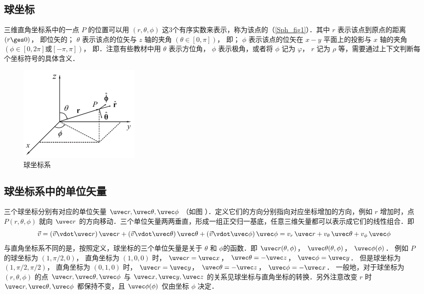 

\subsection{球坐标}

三维直角坐标系中的一点 $P$ 的位置可以用 $(r,\theta ,\phi )$ 这3个有序实数来表示，称为该点的（\autoref{Sph_fig1}）．其中 $r$ 表示该点到原点的距离 $(r \ges 0)$， 即位矢的； $\theta$ 表示该点的位矢与 $z$ 轴的夹角 $(\theta  \in [0,\pi])$， 即； $\phi$ 表示该点的位矢在 $x - y$ 平面上的投影与 $x$ 轴的夹角 $(\phi  \in [0,2\pi]\text{或}[- \pi,\pi])$， 即．注意有些教材中用 $\theta $ 表示方位角， $\phi $ 表示极角，或者将 $\phi $ 记为 $\varphi $，  $r$ 记为 $\rho $ 等，需要通过上下文判断每个坐标符号的具体含义．

\begin{figure}[ht]
\centering
\includegraphics[width=6cm]{./figures/Sph.pdf}
\caption{球坐标系}\label{Sph_fig1}
\end{figure}

\subsection{球坐标系中的单位矢量}
三个球坐标分别有对应的单位矢量 $\uvec r, \uvec\theta, \uvec\phi$ （如图%
）．定义它们的方向分别指向对应坐标增加的方向，例如 $r$ 增加时，点 $P(r,\theta ,\phi )$ 就向 $\uvec r$ 的方向移动．三个单位矢量两两垂直，形成一组正交归一基底，任意三维矢量都可以表示成它们的线性组合．即
\begin{equation}
\vec v = (\vec v \vdot \uvec r)\,\uvec r + (\vec v \vdot \uvec \theta)\,\uvec \theta  + (\vec v \vdot \uvec \phi)\,\uvec \phi  = v_r \,\uvec r + v_\theta \,\uvec \theta  + v_\phi \,\uvec \phi 
\end{equation}
与直角坐标系不同的是，按照定义，球坐标的三个单位矢量是关于 $\theta$ 和 $\phi$的函数．即
$\uvec r(\theta ,\phi )$，  $\uvec \theta (\theta ,\phi )$，  $\uvec \phi (\phi )$． 
例如 $P$ 的球坐标为 $(1, \pi/2, 0)$， 直角坐标为 $(1, 0, 0)$ 时，
$\uvec r = \uvec x$， $\uvec \theta  =  - \uvec z$， $\uvec \phi  = \uvec y$． 
但是球坐标为 $(1, \pi/2, \pi/2)$， 直角坐标为 $(0, 1, 0)$ 时， $\uvec r = \uvec y$， $\uvec \theta  =  - \uvec z$， $\uvec \phi  =  - \uvec x$． 
一般地，对于球坐标为 $(r, \theta , \phi )$ 的点 $\uvec r, \uvec \theta, \uvec \phi$  与 $\uvec x, \uvec y, \uvec z$ 的关系见球坐标与直角坐标的转换．另外注意改变 $r$ 时 $\uvec r, \uvec \theta, \uvec \phi$ 都保持不变，且 $\uvec \phi (\phi )$ 仅由坐标 $\phi $ 决定．

